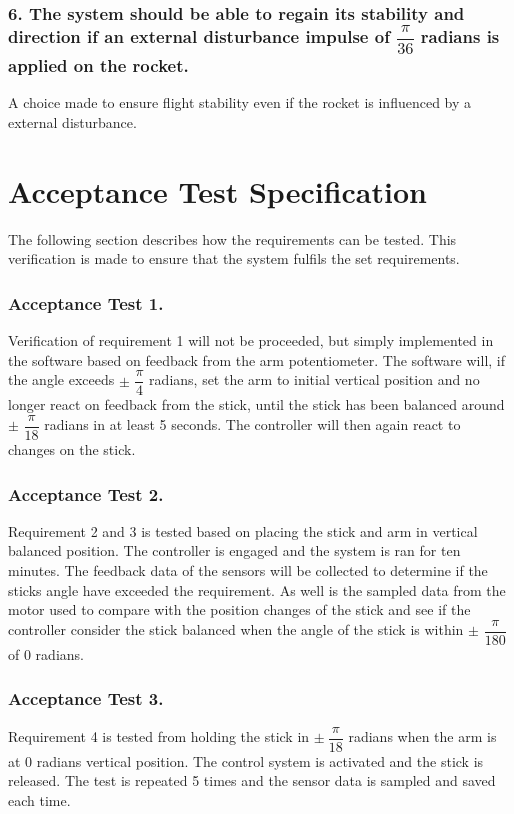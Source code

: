 \subsubsection*{6. The system should be able to regain its stability and direction if an external disturbance impulse of $\dfrac{\pi}{36}$ radians is applied on the rocket.} 

\forceindent  A choice made to ensure flight stability even if the rocket is influenced by a external disturbance.

\section{Acceptance Test Specification}	
The following section describes how the requirements can be tested. This verification is made to ensure that the system fulfils the set requirements.

\subsubsection*{Acceptance Test 1.}

\forceindent Verification of requirement 1 will not be proceeded, but simply implemented in the software based on feedback from the arm potentiometer. The software will, if the angle exceeds $\pm$ $\dfrac{\pi}{4}$ radians, set the arm to initial vertical position and no longer react on feedback from the stick, until the stick has been balanced around $\pm$ $\dfrac{\pi}{18}$ radians in at least 5 seconds. The controller will then again react to changes on the stick.    

\subsubsection*{Acceptance Test 2.}

\forceindent Requirement 2 and 3 is tested based on placing the stick and arm in vertical balanced position. The controller is engaged and the system is ran for ten minutes. The feedback data of the sensors will be collected to determine if the sticks angle have exceeded the requirement. As well is the sampled data from the motor used to compare with the position changes of the stick and see if the controller consider the stick balanced when the angle of the stick is within $\pm$ $\dfrac{\pi}{180}$ of 0 radians. 

\subsubsection*{Acceptance Test 3.}
\forceindent Requirement 4 is tested from holding the stick in $\pm\ \dfrac{\pi}{18}$ radians when the arm is at 0 radians vertical position. The control system is activated and the stick is released. The test is repeated 5 times and the sensor data is sampled and saved each time.   

